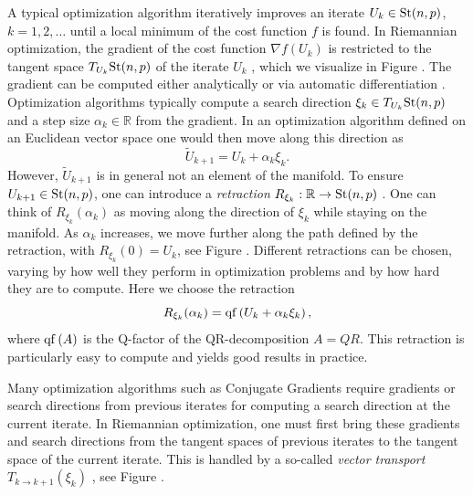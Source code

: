 A typical optimization algorithm iteratively improves an iterate $U_k\in\text{St}(n,p)$, $k=1,2,\dots$ until a local minimum of the cost function $f$ is found. In Riemannian optimization, the gradient of the cost function $\nabla f\left(U_k\right)$ is restricted to the tangent space $T_{U_k}\text{St}(n,p)$ of the iterate $U_k$ \cite{cite:optimization_on_matrix_manifolds}, which we visualize in Figure . The gradient can be computed either analytically or via automatic differentiation \cite{cite:riemannian_geometry_automatic_differentiation_quantum_physics, cite:pymanopt}. Optimization algorithms typically compute a search direction $\xi_k\in T_{U_k}\text{St}(n,p)$ and a step size $\alpha_k \in \mathbb{R}$ from the gradient. In an optimization algorithm defined on an Euclidean vector space one would then move along this direction as
\begin{equation}
	\tilde{U}_{k+1} = U_k + \alpha_k\xi_k.
\end{equation}
However, $\tilde{U}_{k+1}$ is in general not an element of the manifold. To ensure $U_{k+1}\in\text{St}(n,p)$, one can introduce a \textit{retraction} $R_{\xi_k}:\mathbb{R}\to\text{St}(n,p)$ \cite{cite:optimization_on_matrix_manifolds}. One can think of $R_{\xi_k}(\alpha_k)$ as moving along the direction of $\xi_k$ while staying on the manifold. As $\alpha_k$ increases, we move further along the path defined by the retraction, with $R_{\xi_k}(0) = U_k$, see Figure . Different retractions can be chosen, varying by how well they perform in optimization problems and by how hard they are to compute. Here we choose the retraction
\begin{equation}
	R_{\xi_k}(\alpha_k) = \operatorname{qf}\left(U_k + \alpha_k\xi_k\right),
\end{equation}
where $\operatorname{qf}\left(A\right)$ is the Q-factor of the QR-decomposition $A = QR$. This retraction is particularly easy to compute and yields good results in practice. \par
Many optimization algorithms such as Conjugate Gradients require gradients or search directions from previous iterates for computing a search direction at the current iterate. In Riemannian optimization, one must first bring these gradients and search directions from the tangent spaces of previous iterates to the tangent space of the current iterate. This is handled by a so-called \textit{vector transport} $T_{k\rightarrow k+1}\left(\xi_k\right)$ \cite{cite:optimization_on_matrix_manifolds}, see Figure . \par

